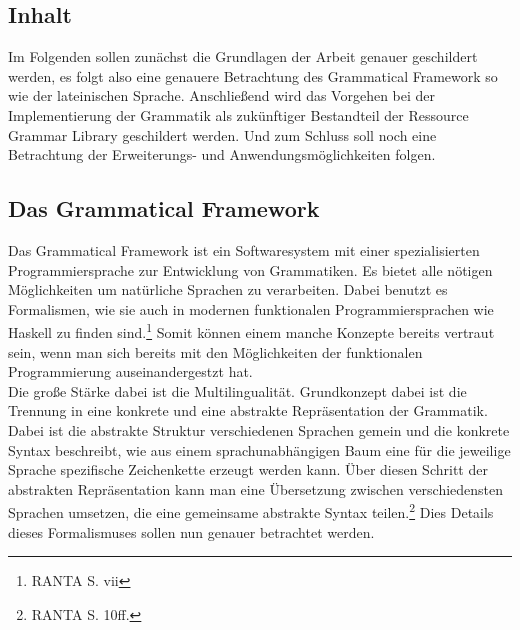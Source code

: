 \documentclass[11pt]{scrartcl}
\begin{document}
\subsection{Inhalt}
Im Folgenden sollen zunächst die Grundlagen der Arbeit genauer geschildert werden, es folgt also eine genauere Betrachtung des Grammatical Framework so wie der lateinischen Sprache. Anschließend wird das Vorgehen bei der Implementierung der Grammatik als zukünftiger Bestandteil der Ressource Grammar Library geschildert werden. Und zum Schluss soll noch eine Betrachtung der Erweiterungs- und Anwendungsmöglichkeiten folgen.
\subsection{Das Grammatical Framework}
Das Grammatical Framework ist ein Softwaresystem mit einer spezialisierten Programmiersprache zur Entwicklung von Grammatiken. Es bietet alle nötigen Möglichkeiten um natürliche Sprachen zu verarbeiten. Dabei benutzt es Formalismen, wie sie auch in modernen funktionalen Programmiersprachen wie Haskell zu finden sind.\footnote{RANTA S. vii} Somit können einem manche Konzepte bereits vertraut sein, wenn man sich bereits mit den Möglichkeiten der funktionalen Programmierung auseinandergestzt hat.\\ 
Die große Stärke dabei ist die Multilingualität. Grundkonzept dabei ist die Trennung in eine konkrete und eine abstrakte Repräsentation der Grammatik. Dabei ist die abstrakte Struktur verschiedenen Sprachen gemein und die konkrete Syntax beschreibt, wie aus einem sprachunabhängigen Baum eine für die jeweilige Sprache spezifische Zeichenkette erzeugt werden kann. Über diesen Schritt der abstrakten Repräsentation kann man eine Übersetzung zwischen verschiedensten Sprachen umsetzen, die eine gemeinsame abstrakte Syntax teilen.\footnote{RANTA S. 10ff.} Dies Details dieses Formalismuses sollen nun genauer betrachtet werden.
\end{document}

